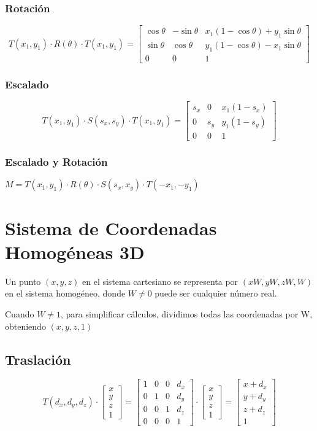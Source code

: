 \subsubsection{Rotación}
$$T(x_1, y_1)\cdot R(\theta) \cdot T(x_1, y_1) = 
\left[\begin{matrix}
\cos \theta & - \sin \theta & x_1(1-\cos \theta)+y_1 \sin \theta \\ \sin \theta & \cos \theta & y_1(1-\cos \theta)-x_1 \sin \theta \\ 0 & 0 & 1
\end{matrix}\right]$$

\subsubsection{Escalado}
$$T(x_1, y_1)\cdot S(s_x, s_y) \cdot T(x_1, y_1) = 
\left[\begin{matrix}
s_x & 0 & x_1(1-s_x) \\ 0 & s_y & y_1(1-s_y) \\ 0 & 0 & 1
\end{matrix}\right]$$

\subsubsection{Escalado y Rotación}
$M=T(x_1, y_1) \cdot R(\theta) \cdot S(s_x, x_y) \cdot T(-x_1, -y_1)$

\section{Sistema de Coordenadas Homogéneas 3D}
Un punto $(x, y, z)$ en el sistema cartesiano se representa por $( xW , yW , zW, W )$ en el sistema homogéneo, donde $W\neq 0$ puede ser cualquier número real.

Cuando $W\neq 1$, para simplificar cálculos, dividimos todas las coordenadas por W, obteniendo $( x , y , z, 1 )$

\subsection{Traslación}
$$T(d_x, d_y, d_z) \cdot
\left[\begin{matrix}
x \\ y \\ z \\ 1
\end{matrix}\right] = 
\left[\begin{matrix}
1 & 0 & 0 & d_x \\ 0 & 1 & 0 & d_y \\ 0 & 0 & 1 & d_z \\ 0 & 0 & 0 & 1
\end{matrix}\right] \cdot
\left[\begin{matrix}
x \\ y \\ z \\ 1
\end{matrix}\right] = 
\left[\begin{matrix}
x+ d_x \\ y+d_y \\ z+d_z \\ 1
\end{matrix}\right]$$

